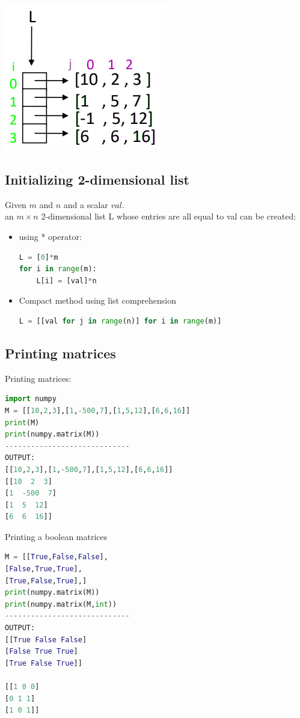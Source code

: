\documentclass[12pt,oneside]{book}
\begin{document}
\begin{minipage}{0.3\linewidth}
	\includegraphics[width=\linewidth]{../pic/python/16}
\end{minipage}
\pagebreak
\subsection{Initializing 2-dimensional list}
Given $m$ and $n$ and a scalar $val$.\\
an $m \times n$ 2-dimensional list L whose entries are all equal to val can be created:
\begin{itemize}
	\item using * operator:
\begin{lstlisting}[language=python]
L = [0]*m 
for i in range(m):
	L[i] = [val]*n
\end{lstlisting}
	\item Compact method using list comprehension
\begin{lstlisting}[language=python]
L = [[val for j in range(n)] for i in range(m)]
\end{lstlisting}
\end{itemize}
\subsection{Printing matrices}
Printing matrices:
{\small\begin{lstlisting}[language=python]
import numpy 
M = [[10,2,3],[1,-500,7],[1,5,12],[6,6,16]]
print(M)
print(numpy.matrix(M))
-----------------------------
OUTPUT: 
[[10,2,3],[1,-500,7],[1,5,12],[6,6,16]]
[[10  2  3]
[1  -500  7]
[1  5  12]
[6  6  16]]
\end{lstlisting}}
Printing a boolean matrices
{\small\begin{lstlisting}[language=python]
M = [[True,False,False],
[False,True,True],
[True,False,True],]
print(numpy.matrix(M))
print(numpy.matrix(M,int))
-----------------------------
OUTPUT: 
[[True False False]
[False True True]
[True False True]]

[[1 0 0]
[0 1 1]
[1 0 1]]
\end{lstlisting}}
\pagebreak
\end{document}
